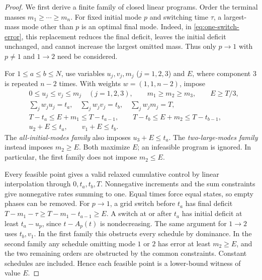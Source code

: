 \begin{proof}
We first derive a finite family of closed linear programs. Order the terminal
masses $m_1\ge\cdots\ge m_n$. For fixed initial mode $p$ and switching
time $\tau$, a largest-mass mode other than $p$ is an optimal final mode.
Indeed, in \eqref{eq:one-switch-error}, this replacement reduces
the final deficit, leaves the initial deficit unchanged, and cannot increase
the largest omitted mass. Thus only $p\to1$ with $p\ne1$ and $1\to2$
need be considered.

For $1\le a\le b\le N$, use variables $u_j,v_j,m_j$ ($j=1,2,3$) and
$E$, where component $3$ is repeated $n-2$ times. With weights
$w=(1,1,n-2)$, impose
\begin{subequations}\label{eq:grid-LP}
\begin{align}
 &0\le u_j\le v_j\le m_j\quad(j=1,2,3),\qquad
 m_1\ge m_2\ge m_3,\qquad E\ge T/3,\\
 &\sum_jw_ju_j=t_a,\quad\sum_jw_jv_j=t_b,
       \quad\sum_jw_jm_j=T,\\
 &T-t_a\le E+m_1\le T-t_{a-1},\qquad
 T-t_b\le E+m_2\le T-t_{b-1},\\
 &u_2+E\le t_a,\qquad v_1+E\le t_b.
\end{align}
\end{subequations}
The \emph{all-initial-modes family} also imposes $u_3+E\le t_a$.
The \emph{two-large-modes family} instead imposes $m_2\ge E$.
Both maximize $E$; an infeasible program is ignored. In particular, the
first family does not impose $m_2\le E$.

Every feasible point gives a valid relaxed cumulative control by linear
interpolation through $0,t_a,t_b,T$. Nonnegative increments and the sum
constraints give nonnegative rates summing to one. Equal times force equal
states, so empty phases can be removed. For $p\to1$, a grid switch before
$t_a$ has final deficit
$T-m_1-\tau\ge T-m_1-t_{a-1}\ge E$.
A switch at or after $t_a$ has initial deficit at least $t_a-u_p$, since
$t-A_p(t)$ is nondecreasing. The same argument for $1\to2$ uses $t_b,v_1$.
In the first family this obstructs every schedule by dominance. In the
second family any schedule omitting mode $1$ or $2$ has error at least
$m_2\ge E$, and the two remaining orders are obstructed by the common
constraints. Constant schedules are included. Hence each feasible point
is a lower-bound witness of value $E$.


\end{proof}
